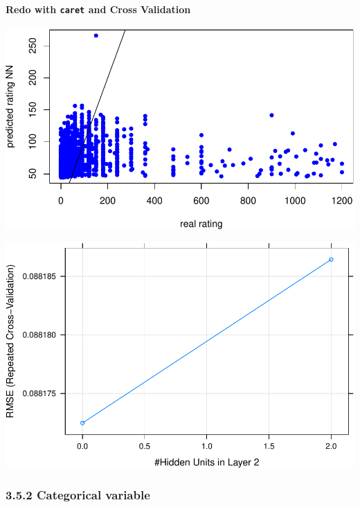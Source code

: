\documentclass[
]{article}
\begin{document}
\hypertarget{redo-with-caret-and-cross-validation}{%
\paragraph{\texorpdfstring{Redo with \texttt{caret} and Cross
Validation}{Redo with caret and Cross Validation}}\label{redo-with-caret-and-cross-validation}}

\includegraphics{ESS_DE_files/figure-latex/unnamed-chunk-9-1.pdf}

\includegraphics{ESS_DE_files/figure-latex/unnamed-chunk-10-1.pdf}

\hypertarget{categorical-variable}{%
\subsubsection{3.5.2 Categorical variable}\label{categorical-variable}}
\end{document}
